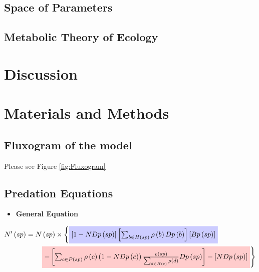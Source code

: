 \documentclass[10pt]{article}
\begin{document}
\subsection*{Space of Parameters}

\vspace{0.25cm}
\subsection*{Metabolic Theory of Ecology}

\section*{Discussion}

\section*{Materials and Methods}

\vspace{0.25cm}
\subsection*{Fluxogram of the model}

Please see Figure \ref{fig:Fluxogram}

\vspace{0.25cm}
\subsection*{Predation Equations}

\vspace{0.25cm}
\begin{itemize}
\item \textbf{General Equation}
\end{itemize}

\begin{align*}
 N^\prime\left(sp\right) & = N\left(sp\right) \times \left\{ \tikz[baseline]{\node[fill=blue!20,anchor=base] (t1) { $\left[ 1 - NDp\left(sp\right) \right]\left[ \sum_{b \in H\left(sp\right)}\rho\left(b\right)Dp\left(b\right) \right]\left[Bp\left(sp\right)\right]$ };}  \right.\nonumber  \\
 &\qquad \left. \tikz[baseline]{\node[fill=red!20,anchor=base] (t2) {$- \left[\sum_{c \in P\left(sp\right)}\rho\left(c\right)\left( 1-NDp \left(c \right) \right)\frac{\rho\left(sp\right)}{\sum_{d \in H\left(c\right)}\rho\left(d\right)}Dp\left(sp\right)\right]-\left[NDp\left(sp\right)\right]$ };} \right\} 
\end{align*}
\end{document}
